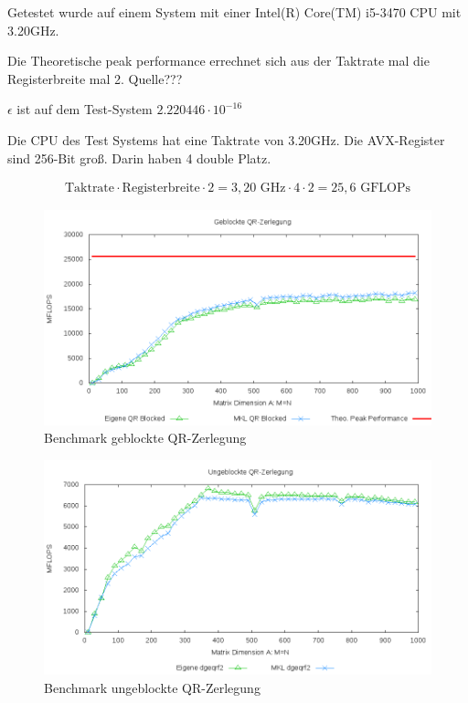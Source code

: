 Getestet wurde auf einem System mit einer Intel(R) Core(TM) i5-3470 CPU mit 3.20GHz. 

Die Theoretische peak performance errechnet sich aus der Taktrate mal die Registerbreite mal 2. Quelle???

$\epsilon$ ist auf dem Test-System $2.220446\cdot10^{-16}$

Die CPU des Test Systems hat eine Taktrate von 3.20GHz.
Die AVX-Register sind 256-Bit groß. Darin haben 4 double Platz.

\begin{align*}
	\text{Taktrate} \cdot \text{Registerbreite} \cdot 2= 3,20 \text{ GHz} \cdot 4 \cdot 2 = 25,6 \text{ GFLOPs}
\end{align*}

\begin{figure}[H]
	\includegraphics[width=\textwidth]{images/blk.png}
	\caption{Benchmark geblockte QR-Zerlegung}
	\label{img:blk}
\end{figure}

\begin{figure}[H]
	\includegraphics[width=\textwidth]{images/unblk.png}
	\caption{Benchmark ungeblockte QR-Zerlegung}
	\label{img:unblk}
\end{figure}








	 
